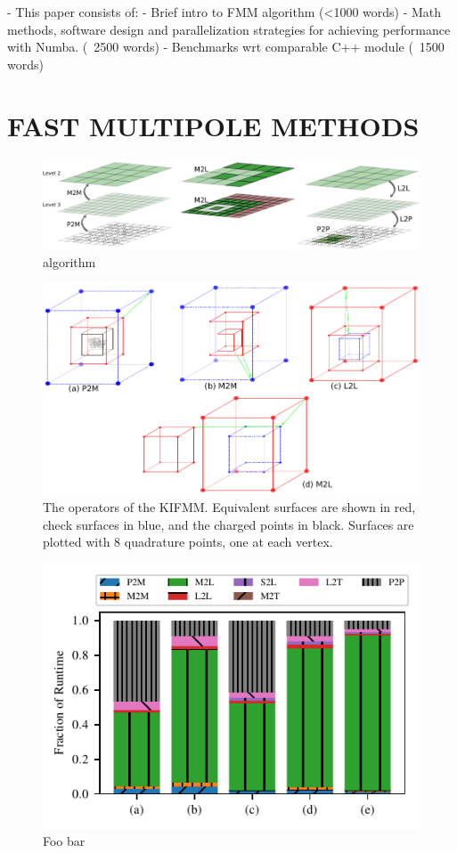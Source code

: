 \documentclass{IEEEcsmag}
\begin{document}
- This paper consists of:
	- Brief intro to FMM algorithm (<1000 words)
	- Math methods, software design and parallelization strategies for achieving performance with Numba. (~2500 words)
	- Benchmarks wrt comparable C++ module (~1500 words)

\section{FAST MULTIPOLE METHODS}

\begin{figure}
	\centerline{\includegraphics {figures/algorithm.pdf}}
	\caption{algorithm}
	\label{fig:agorithm}
\end{figure}

\begin{figure}
	\centerline{\includegraphics {figures/operators.pdf}}
	\caption{The operators of the KIFMM. Equivalent surfaces are shown in red, check surfaces in blue, and the charged points in black. Surfaces are plotted with 8 quadrature points, one at each vertex.}
	\label{fig:operators}
\end{figure}
\begin{figure}
	\centerline{\includegraphics {figures/operator_runtimes.pdf}}
	\caption{Foo bar}
	\label{fig:operator_runtimes}
\end{figure}
\end{document}
